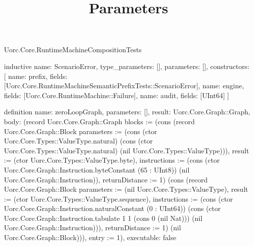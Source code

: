 \begin{lexlean}{Uorc.Core.RuntimeMachineCompositionTests}
\title{Parameters}
\begin{semanticmodule}
inductive{
  name: ScenarioError,
  type_parameters: [],
  parameters: [],
  constructors: [
    {name: prefix, fields: [Uorc.Core.RuntimeMachineSemanticPrefixTests::ScenarioError]},
    {name: engine, fields: [Uorc.Core.RuntimeMachine::Failure]},
    {name: audit, fields: [UInt64]}
  ]
}

definition{
  name: zeroLoopGraph,
  parameters: [],
  result: Uorc.Core.Graph::Graph,
  body: (record Uorc.Core.Graph::Graph {blocks := (cons (record Uorc.Core.Graph::Block {parameters := (cons (ctor Uorc.Core.Types::ValueType.natural) (cons (ctor Uorc.Core.Types::ValueType.natural) (nil Uorc.Core.Types::ValueType))), result := (ctor Uorc.Core.Types::ValueType.byte), instructions := (cons (ctor Uorc.Core.Graph::Instruction.byteConstant (65 : UInt8)) (nil Uorc.Core.Graph::Instruction)), returnDistance := 1}) (cons (record Uorc.Core.Graph::Block {parameters := (nil Uorc.Core.Types::ValueType), result := (ctor Uorc.Core.Types::ValueType.sequence), instructions := (cons (ctor Uorc.Core.Graph::Instruction.naturalConstant (0 : UInt64)) (cons (ctor Uorc.Core.Graph::Instruction.tabulate 1 1 (cons 0 (nil Nat))) (nil Uorc.Core.Graph::Instruction))), returnDistance := 1}) (nil Uorc.Core.Graph::Block))), entry := 1}),
  executable: false
}


\end{semanticmodule}
\end{lexlean}
